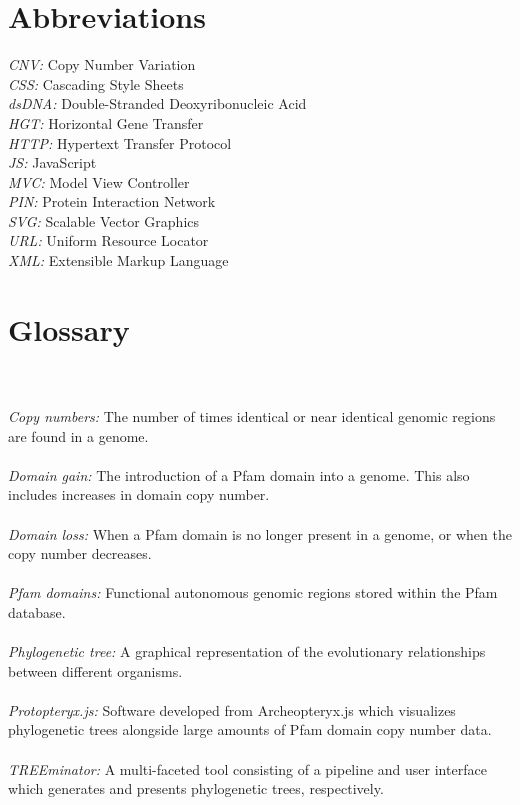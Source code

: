 \documentclass[12pt,a4paper]{article}
\begin{document}
\section*{Abbreviations}
\doublespacing
\textit{CNV:} Copy Number Variation\\
\textit{CSS:} Cascading Style Sheets\\
\textit{dsDNA:} Double-Stranded Deoxyribonucleic Acid\\
\textit{HGT:} Horizontal Gene Transfer\\
\textit{HTTP:} Hypertext Transfer Protocol\\
\textit{JS:} JavaScript\\
\textit{MVC:} Model View Controller\\
\textit{PIN:} Protein Interaction Network\\
\textit{SVG:} Scalable Vector Graphics\\
\textit{URL:} Uniform Resource Locator\\
\textit{XML:} Extensible Markup Language

\newpage
\section*{Glossary}
\label{sec:glossary}
\doublespacing
{}\\\\
\textit{Copy numbers:} The number of times identical or near identical genomic regions are found in a genome.\\\\
\textit{Domain gain:} The introduction of a Pfam domain into a genome. This also includes increases in domain copy number.\\\\
\textit{Domain loss:} When a Pfam domain is no longer present in a genome, or when the copy number decreases.\\\\
\textit{Pfam domains:} Functional autonomous genomic regions stored within the Pfam database.\\\\
\textit{Phylogenetic tree:} A graphical representation of the evolutionary relationships between different organisms.\\\\
\textit{Protopteryx.js:} Software developed from Archeopteryx.js which visualizes phylogenetic trees alongside large amounts of Pfam domain copy number data.\\\\
\textit{TREEminator:} A multi-faceted tool consisting of a pipeline and user interface which generates and presents phylogenetic trees, respectively.\\
\end{document}
